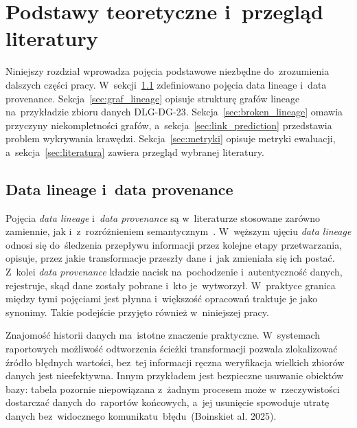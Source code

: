 \documentclass[polish,master,a4paper,oneside]{ppfcmthesis}
\begin{document}
\chapter{Podstawy teoretyczne i~przegląd literatury}

Niniejszy rozdział wprowadza pojęcia podstawowe niezbędne do~zrozumienia
dalszych części pracy. W~sekcji~\ref{sec:lineage_def} zdefiniowano pojęcia
data lineage i~data provenance. Sekcja~\ref{sec:graf_lineage} opisuje
strukturę grafów lineage na~przykładzie zbioru danych DLG-DG-23.
Sekcja~\ref{sec:broken_lineage} omawia przyczyny niekompletności grafów,
a~sekcja~\ref{sec:link_prediction} przedstawia problem wykrywania krawędzi.
Sekcja~\ref{sec:metryki} opisuje metryki ewaluacji, a~sekcja~\ref{sec:literatura}
zawiera przegląd wybranej literatury.

\section{Data lineage i~data provenance}
\label{sec:lineage_def}

Pojęcia \emph{data lineage} i~\emph{data provenance} są w~literaturze
stosowane zarówno zamiennie, jak i~z~rozróżnieniem semantycznym~\cite{Psallidas2022}.
W~węższym ujęciu \emph{data lineage} odnosi się do~śledzenia przepływu
informacji przez kolejne etapy przetwarzania, opisuje, przez jakie
transformacje przeszły dane i~jak zmieniała się ich postać. Z~kolei
\emph{data provenance} kładzie nacisk na~pochodzenie i~autentyczność danych,
rejestruje, skąd dane zostały pobrane i~kto je~wytworzył. W~praktyce
granica między tymi pojęciami jest płynna i~większość opracowań traktuje je
jako synonimy. Takie podejście przyjęto również w~niniejszej
pracy.

Znajomość historii danych ma~istotne znaczenie praktyczne. W~systemach
raportowych możliwość odtworzenia ścieżki transformacji pozwala zlokalizować
źródło błędnych wartości, bez~tej informacji ręczna weryfikacja wielkich
zbiorów danych jest nieefektywna. Innym przykładem jest bezpieczne usuwanie
obiektów bazy: tabela pozornie niepowiązana z~żadnym procesem może
w~rzeczywistości dostarczać danych do~raportów końcowych, a~jej usunięcie
spowoduje utratę danych bez~widocznego komunikatu~błędu~(Boinskiet al. 2025)\cite{Boinski2025}.

\end{document}

